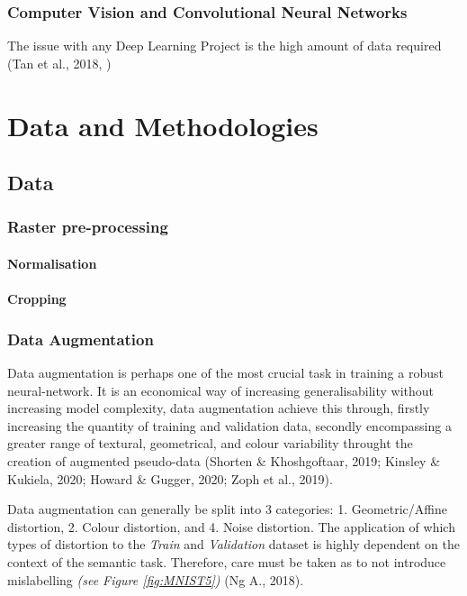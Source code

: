 \documentclass[11pt, a4paper, twoside]{report}
\begin{document}
\subsection{Computer Vision and Convolutional Neural Networks}\label{CVandCNN}

The issue with any Deep Learning Project is the high amount of data required (Tan et al., 2018, )

\newpage

\chapter{Data and Methodologies}\label{DataandMethods}
\section{Data}\label{Data}

\subsection{Raster pre-processing}
\subsubsection{Normalisation}

\subsubsection{Cropping}

\subsection{Data Augmentation}\label{DataAug}

Data augmentation is perhaps one of the most crucial task in training a robust neural-network. It is an economical way of increasing generalisability without increasing model complexity, data augmentation achieve this through, firstly increasing the quantity of training and validation data, secondly encompassing a greater range of textural, geometrical, and colour variability throught the creation of augmented pseudo-data (Shorten \& Khoshgoftaar, 2019; Kinsley \& Kukiela, 2020; Howard \& Gugger, 2020; Zoph et al., 2019).\\\par

Data augmentation can generally be split into 3 categories: 1. Geometric/Affine distortion, 2. Colour distortion, and 4. Noise distortion. The application of which types of distortion to the \textit{Train} and \textit{Validation} dataset is highly dependent on the context of the semantic task. Therefore, care must be taken as to not introduce mislabelling \textit{(see Figure \ref{fig:MNIST5})} (Ng A., 2018).\\\par
\end{document}
